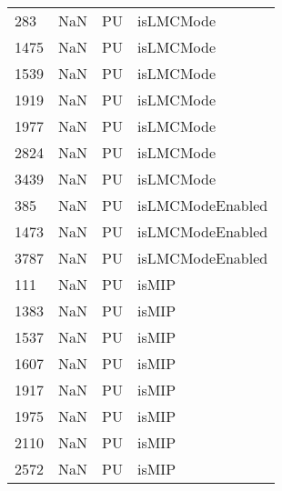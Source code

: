 \begin{tabular}{llll}
283  &                   NaN &                         PU &                                 isLMCMode \\
1475 &                   NaN &                         PU &                                 isLMCMode \\
1539 &                   NaN &                         PU &                                 isLMCMode \\
1919 &                   NaN &                         PU &                                 isLMCMode \\
1977 &                   NaN &                         PU &                                 isLMCMode \\
2824 &                   NaN &                         PU &                                 isLMCMode \\
3439 &                   NaN &                         PU &                                 isLMCMode \\
385  &                   NaN &                         PU &                          isLMCModeEnabled \\
1473 &                   NaN &                         PU &                          isLMCModeEnabled \\
3787 &                   NaN &                         PU &                          isLMCModeEnabled \\
111  &                   NaN &                         PU &                                     isMIP \\
1383 &                   NaN &                         PU &                                     isMIP \\
1537 &                   NaN &                         PU &                                     isMIP \\
1607 &                   NaN &                         PU &                                     isMIP \\
1917 &                   NaN &                         PU &                                     isMIP \\
1975 &                   NaN &                         PU &                                     isMIP \\
2110 &                   NaN &                         PU &                                     isMIP \\
2572 &                   NaN &                         PU &                                     isMIP \\

\end{tabular}
